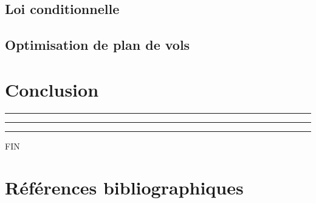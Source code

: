 \documentclass[a4paper, 12pt,twoside]{article}
\begin{document}
	
    \subsection{Loi conditionnelle}
    
     \subsection{Optimisation de plan de vols}
    
    \clearpage

    \section{Conclusion}


    \begin{center}
        \color{bleu303}

        \rule{0.3\textwidth}{0.2mm}\vspace*{-3.5mm}

        \rule{0.5\textwidth}{0.6mm}\vspace*{-3.8mm}

        \rule{0.3\textwidth}{0.2mm}\vspace*{-1mm}

        \sffamily FIN
    \end{center}
    
     \clearpage
        \section{Références bibliographiques}
        {
        \renewcommand{\section}[2]{} %
        \nocite{*}
        
        
        }

    
\end{document}
